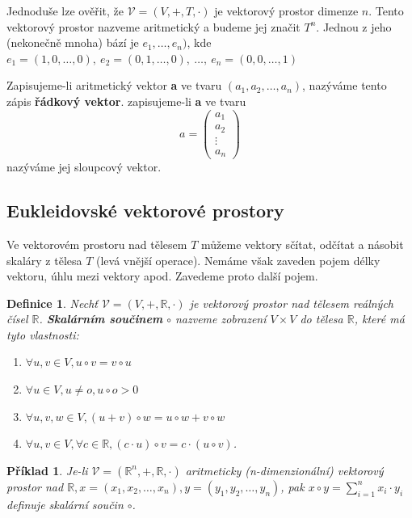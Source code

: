 \documentclass[12pt,a4paper]{article}
\newtheorem{definition}{Definice}
\newtheorem{example}{Příklad}
\begin{document}
Jednoduše lze ověřit, že $\mathscr{V} = (V,+,T,\cdot)$ je vektorový prostor dimenze $n$. Tento vektorový prostor nazveme aritmetický a budeme jej značit $T^n$. Jednou z jeho (nekonečně mnoha) bází je $e_1, \dots, e_n)$, kde $e_1 = (1,0,\dots, 0),\ e_2 = (0,1,\dots, 0),\ \dots, \ e_n = (0,0,\dots, 1)$ 

Zapisujeme-li aritmetický vektor \textbf{a} ve tvaru $(a_1,a_2, \dots, a_n)$, nazýváme tento zápis \textbf{řádkový vektor}. zapisujeme-li \textbf{a} ve tvaru 
\begin{displaymath}
	a = \left( 
	 \begin{array}{c}
		a_1\\ a_2 \\ \vdots \\ a_n
	\end{array}\right)
\end{displaymath}
nazýváme jej sloupcový vektor.
\subsection{Eukleidovské vektorové prostory}
Ve vektorovém prostoru nad tělesem $T$ můžeme vektory sčítat, odčítat a násobit skaláry z tělesa $T$ (levá vnější operace). Nemáme však zaveden pojem délky vektoru, úhlu mezi vektory apod. Zavedeme proto další pojem.

\begin{definition}
	Nechť $\mathscr{V} = (V, +, \mathbb{R}, \cdot)$ je vektorový prostor nad tělesem reálných čísel $\mathbb{R}$. \textbf{Skalárním součinem} $\circ$ nazveme zobrazení $V \times V$ do tělesa $\mathbb{R}$, které má tyto vlastnosti:
	\begin{enumerate}
		\item $\forall u,v \in V, u \circ v = v \circ u$
		\item $\forall u \in V, u \not= o, u \circ o > 0$
		\item $\forall u,v,w \in V, (u + v) \circ w = u \circ w + v \circ w$
		\item $\forall u,v \in V, \forall c \in \mathbb{R}, (c \cdot u) \circ v = c \cdot (u \circ v)$.
	\end{enumerate}
\end{definition}

\begin{example}
	Je-li $\mathscr{V} = (\mathbb{R}^n, +, \mathbb{R}, \cdot)$ aritmeticky (n-dimenzionální) vektorový prostor nad $\mathbb{R}, x = (x_1,x_2, \dots, x_n), y = (y_1,y_2, \dots, y_n)$, pak $x \circ y = \sum^n_{i=1} x_i \cdot y_i$ definuje skalární součin $\circ$.
\end{example}
\end{document}
